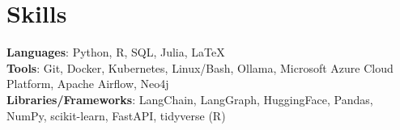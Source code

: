 \documentclass[letterpaper,11pt]{article}
\makeatletter
\newcommand{\resumeItem}[1]{
  \item\small{
    {#1 \vspace{-2pt}}
  }
}
\newcommand{\resumeSubheading}[4]{
  \vspace{-2pt}\item
    \begin{tabular*}{1.0\textwidth}[t]{l@{\extracolsep{\fill}}r}
      \textbf{#1} & \small #2 \\
      \textit{\small#3} & \textit{\small #4} \\
    \end{tabular*}\vspace{-7pt}
}
\newcommand{\resumeSubHeadingListStart}{\begin{itemize}[leftmargin=0.0in, label={}]}
\newcommand{\resumeSubHeadingListEnd}{\end{itemize}}
\newcommand{\resumeItemListStart}{\begin{itemize}}
\newcommand{\resumeItemListEnd}{\end{itemize}\vspace{-5pt}}
\makeatother
\begin{document}
\section{Skills}
  \begin{itemize}[leftmargin=0.15in, label={}]
      \small{\item{
      \textbf{Languages}{: Python, R, SQL, Julia, \LaTeX} \\
      \textbf{Tools}{: Git, Docker, Kubernetes, Linux/Bash, Ollama, Microsoft Azure Cloud Platform, Apache Airflow, Neo4j} \\
      \textbf{Libraries/Frameworks}{: LangChain, LangGraph, HuggingFace, Pandas, NumPy, scikit-learn, FastAPI, tidyverse (R)}  \\
      }}
  \end{itemize} 

\end{document}
